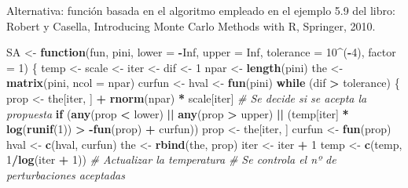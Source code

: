 \documentclass[]{book}
\newenvironment{Shaded}{\begin{snugshade}}{\end{snugshade}}
\newcommand{\KeywordTok}[1]{\textcolor[rgb]{0.13,0.29,0.53}{\textbf{#1}}}
\newcommand{\DataTypeTok}[1]{\textcolor[rgb]{0.13,0.29,0.53}{#1}}
\newcommand{\DecValTok}[1]{\textcolor[rgb]{0.00,0.00,0.81}{#1}}
\newcommand{\StringTok}[1]{\textcolor[rgb]{0.31,0.60,0.02}{#1}}
\newcommand{\CommentTok}[1]{\textcolor[rgb]{0.56,0.35,0.01}{\textit{#1}}}
\newcommand{\OtherTok}[1]{\textcolor[rgb]{0.56,0.35,0.01}{#1}}
\newcommand{\ControlFlowTok}[1]{\textcolor[rgb]{0.13,0.29,0.53}{\textbf{#1}}}
\newcommand{\OperatorTok}[1]{\textcolor[rgb]{0.81,0.36,0.00}{\textbf{#1}}}
\newcommand{\NormalTok}[1]{#1}
\theoremstyle{definition}
\theoremstyle{definition}
\theoremstyle{definition}
\theoremstyle{remark}
\begin{document}
Alternativa: función basada en el algoritmo empleado en el ejemplo 5.9
del libro: Robert y Casella, Introducing Monte Carlo Methods with R,
Springer, 2010.

\begin{Shaded}
\begin{Highlighting}[]
\NormalTok{SA <-}\StringTok{ }\ControlFlowTok{function}\NormalTok{(fun, pini, }\DataTypeTok{lower =} \OperatorTok{-}\OtherTok{Inf}\NormalTok{, }\DataTypeTok{upper =} \OtherTok{Inf}\NormalTok{, }\DataTypeTok{tolerance =} \DecValTok{10}\OperatorTok{^}\NormalTok{(}\OperatorTok{-}\DecValTok{4}\NormalTok{), }\DataTypeTok{factor =} \DecValTok{1}\NormalTok{) \{}
\NormalTok{  temp <-}\StringTok{ }\NormalTok{scale <-}\StringTok{ }\NormalTok{iter <-}\StringTok{ }\NormalTok{dif <-}\StringTok{ }\DecValTok{1}
\NormalTok{  npar <-}\StringTok{ }\KeywordTok{length}\NormalTok{(pini) }
\NormalTok{  the <-}\StringTok{ }\KeywordTok{matrix}\NormalTok{(pini, }\DataTypeTok{ncol =}\NormalTok{ npar)}
\NormalTok{  curfun <-}\StringTok{ }\NormalTok{hval <-}\StringTok{ }\KeywordTok{fun}\NormalTok{(pini)}
  \ControlFlowTok{while}\NormalTok{ (dif }\OperatorTok{>}\StringTok{ }\NormalTok{tolerance) \{}
\NormalTok{    prop <-}\StringTok{ }\NormalTok{the[iter, ] }\OperatorTok{+}\StringTok{ }\KeywordTok{rnorm}\NormalTok{(npar) }\OperatorTok{*}\StringTok{ }\NormalTok{scale[iter]}
    \CommentTok{# Se decide si se acepta la propuesta}
    \ControlFlowTok{if}\NormalTok{ (}\KeywordTok{any}\NormalTok{(prop }\OperatorTok{<}\StringTok{ }\NormalTok{lower) }\OperatorTok{||}\StringTok{ }\KeywordTok{any}\NormalTok{(prop }\OperatorTok{>}\StringTok{ }\NormalTok{upper) }\OperatorTok{||}\StringTok{ }
\StringTok{        }\NormalTok{(temp[iter] }\OperatorTok{*}\StringTok{ }\KeywordTok{log}\NormalTok{(}\KeywordTok{runif}\NormalTok{(}\DecValTok{1}\NormalTok{)) }\OperatorTok{>}\StringTok{ }\OperatorTok{-}\KeywordTok{fun}\NormalTok{(prop) }\OperatorTok{+}\StringTok{ }\NormalTok{curfun))  prop <-}\StringTok{ }\NormalTok{the[iter, ]}
\NormalTok{    curfun <-}\StringTok{ }\KeywordTok{fun}\NormalTok{(prop)}
\NormalTok{    hval <-}\StringTok{ }\KeywordTok{c}\NormalTok{(hval, curfun)}
\NormalTok{    the <-}\StringTok{ }\KeywordTok{rbind}\NormalTok{(the, prop)}
\NormalTok{    iter <-}\StringTok{ }\NormalTok{iter }\OperatorTok{+}\StringTok{ }\DecValTok{1}
\NormalTok{    temp <-}\StringTok{ }\KeywordTok{c}\NormalTok{(temp, }\DecValTok{1}\OperatorTok{/}\KeywordTok{log}\NormalTok{(iter }\OperatorTok{+}\StringTok{ }\DecValTok{1}\NormalTok{))  }\CommentTok{# Actualizar la temperatura}
    \CommentTok{# Se controla el nº de perturbaciones aceptadas}

\end{Highlighting}
\end{Shaded}
\end{document}

